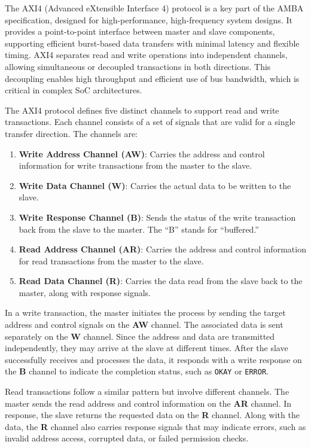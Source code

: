 The AXI4 (Advanced eXtensible Interface 4) protocol is a key part of the AMBA specification, designed for high-performance, high-frequency system designs. It provides a point-to-point interface between master and slave components, supporting efficient burst-based data transfers with minimal latency and flexible timing. AXI4 separates read and write operations into independent channels, allowing simultaneous or decoupled transactions in both directions. This decoupling enables high throughput and efficient use of bus bandwidth, which is critical in complex SoC architectures.

The AXI4 protocol defines five distinct channels to support read and write transactions. Each channel consists of a set of signals that are valid for a single transfer direction. The channels are:

\begin{enumerate}
    \item \textbf{Write Address Channel (AW)}: Carries the address and control information for write transactions from the master to the slave.
    \item \textbf{Write Data Channel (W)}: Carries the actual data to be written to the slave.
    \item \textbf{Write Response Channel (B)}: Sends the status of the write transaction back from the slave to the master. The “B” stands for “buffered.”
    \item \textbf{Read Address Channel (AR)}: Carries the address and control information for read transactions from the master to the slave.
    \item \textbf{Read Data Channel (R)}: Carries the data read from the slave back to the master, along with response signals.
\end{enumerate}

In a write transaction, the master initiates the process by sending the target address and control signals on the \textbf{AW} channel. The associated data is sent separately on the \textbf{W} channel. Since the address and data are transmitted independently, they may arrive at the slave at different times. After the slave successfully receives and processes the data, it responds with a write response on the \textbf{B} channel to indicate the completion status, such as \texttt{OKAY} or \texttt{ERROR}.

Read transactions follow a similar pattern but involve different channels. The master sends the read address and control information on the \textbf{AR} channel. In response, the slave returns the requested data on the \textbf{R} channel. Along with the data, the \textbf{R} channel also carries response signals that may indicate errors, such as invalid address access, corrupted data, or failed permission checks.

